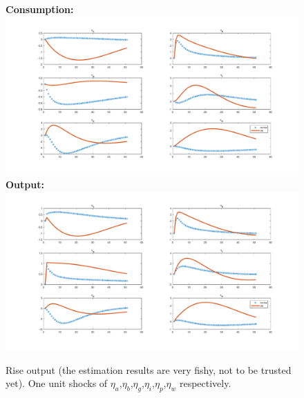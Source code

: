\documentclass[12pt,reqno]{article}
\numberwithin{equation}{section}
\begin{document}
\begin{figure}[H]
\caption{Rise output (the estimation results are very fishy, not to be trusted yet). One unit shocks of $\eta_a$,$\eta_b$,$\eta_g$,$\eta_i$,$\eta_p$,$\eta_w$ respectively.}
\textbf{Consumption:}\\
\includegraphics[scale=0.5]{rise_impresp_cons.pdf}
\textbf{Output:}\\
\includegraphics[scale=0.5]{rise_impresp_output.pdf}
\end{figure}
\end{document}
